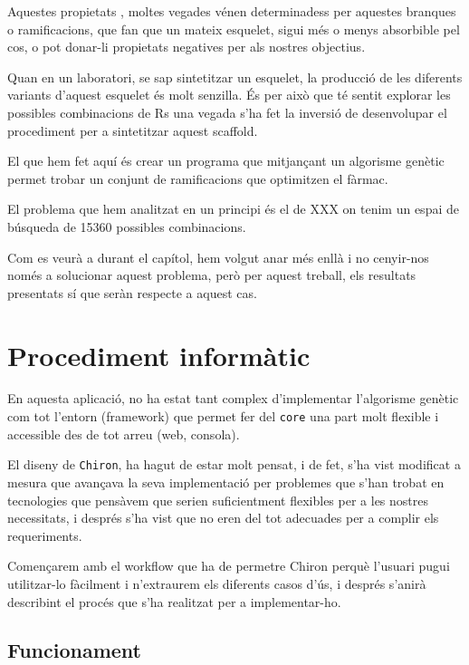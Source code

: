 	Aquestes propietats , moltes vegades vénen determinadess per aquestes
	branques o ramificacions, que fan que un mateix esquelet, sigui més o menys
	absorbible pel cos, o pot donar-li propietats negatives per als nostres
	objectius.

	Quan en un laboratori, se sap sintetitzar un esquelet, la producció de les
	diferents variants d'aquest esquelet és molt senzilla.  És per això que té
	sentit explorar les possibles combinacions de Rs una vegada s'ha fet la
	inversió de desenvolupar el procediment per a sintetitzar aquest scaffold.

	El que hem fet aquí és crear un programa que mitjançant un algorisme
	genètic permet trobar un conjunt de ramificacions que optimitzen el fàrmac.

	El problema que hem analitzat en un principi és el de XXX
	on tenim un espai de búsqueda de 15360 possibles combinacions.

	Com es veurà a durant el capítol, hem volgut anar més enllà i no cenyir-nos
	només a solucionar aquest problema, però per aquest treball, els resultats
	presentats sí que seràn respecte a aquest cas.

\section{Procediment informàtic} %
\label{sec:Procediment informatic}

En aquesta aplicació, no ha estat tant complex d'implementar l'algorisme genètic
com tot l'entorn (framework) que permet fer del \texttt{core} una part molt
flexible i accessible des de tot arreu (web, consola).

El diseny de \texttt{Chiron}, ha hagut de estar molt pensat, i de fet, s'ha vist
modificat a mesura que avançava la seva implementació per problemes que s'han
trobat en tecnologies que pensàvem que serien suficientment flexibles per a les
nostres necessitats, i després s'ha vist que no eren del tot adecuades per a
complir els requeriments.

Començarem amb el workflow que ha de permetre Chiron perquè l'usuari pugui
utilitzar-lo fàcilment i n'extraurem els diferents casos d'ús, i després
s'anirà describint el procés que s'ha realitzat per a implementar-ho.

\subsection{Funcionament} %
\label{sub:Funcionament}

